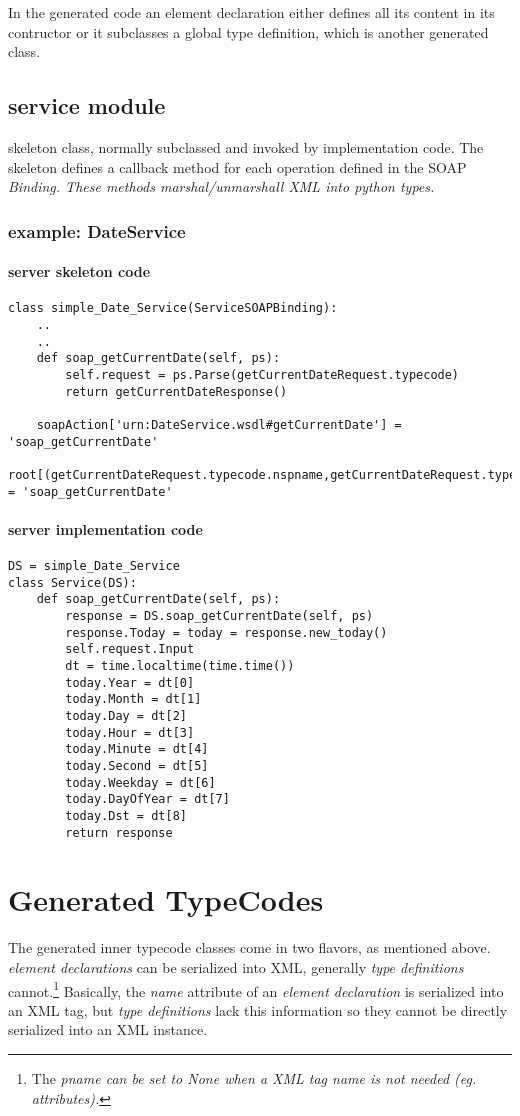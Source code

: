 In the generated code an element declaration either defines all its content in
its contructor or it subclasses a global type definition, which is another
generated class.


\subsection{service module}
skeleton class, normally subclassed and invoked by implementation code.  The
skeleton defines a callback method for each operation defined in the SOAP
\it{Binding}.  These methods marshal/unmarshall XML into python types.

\subsubsection{example: DateService}
\paragraph{server skeleton code}
\begin{verbatim}
class simple_Date_Service(ServiceSOAPBinding):
    ..
    ..
    def soap_getCurrentDate(self, ps):
        self.request = ps.Parse(getCurrentDateRequest.typecode)
        return getCurrentDateResponse()

    soapAction['urn:DateService.wsdl#getCurrentDate'] = 'soap_getCurrentDate'
    root[(getCurrentDateRequest.typecode.nspname,getCurrentDateRequest.typecode.pname)] = 'soap_getCurrentDate'

\end{verbatim}
\paragraph{server implementation code}
\begin{verbatim}
DS = simple_Date_Service
class Service(DS):
    def soap_getCurrentDate(self, ps):
        response = DS.soap_getCurrentDate(self, ps)
        response.Today = today = response.new_today()
        self.request.Input
        dt = time.localtime(time.time())
        today.Year = dt[0]
        today.Month = dt[1]
        today.Day = dt[2]
        today.Hour = dt[3]
        today.Minute = dt[4]
        today.Second = dt[5]
        today.Weekday = dt[6]
        today.DayOfYear = dt[7]
        today.Dst = dt[8]
        return response
\end{verbatim}


\section{Generated TypeCodes}
The generated inner typecode classes come in two flavors, as mentioned above.
{\it element declarations} can be serialized into XML, generally {\it type
definitions} cannot.\footnote{The \it{pname} can be set to \it{None} when a XML
tag name is not needed (eg. attributes).}   Basically, the {\it name}
attribute of an {\it element declaration} is serialized into an XML tag, but
{\it type definitions} lack this information so they cannot be directly
serialized into an XML instance.

